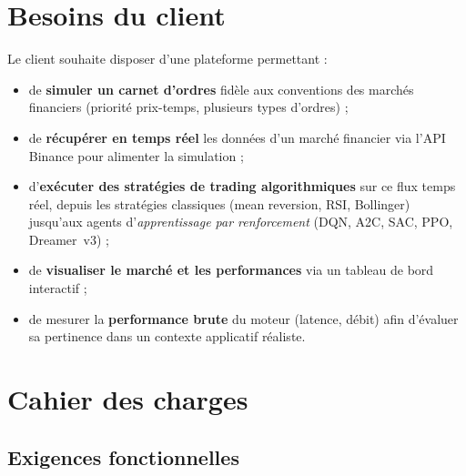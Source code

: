 \documentclass[11pt,a4paper]{article}
\begin{document}
\section{Besoins du client}
\label{sec:besoins}

Le client souhaite disposer d'une plateforme permettant :

\begin{itemize}[leftmargin=1.2cm]
    \item de \textbf{simuler un carnet d'ordres} fidèle aux
          conventions des marchés financiers (priorité prix-temps,
          plusieurs types d'ordres) ;
    \item de \textbf{récupérer en temps réel} les données d'un
          marché financier via l'API Binance pour alimenter la simulation ;
    \item d'\textbf{exécuter des stratégies de trading
          algorithmiques} sur ce flux temps réel, depuis les
          stratégies classiques (mean reversion, RSI, Bollinger)
          jusqu'aux agents d'\textit{apprentissage par
          renforcement} (DQN, A2C, SAC, PPO, Dreamer~v3) ;
    \item de \textbf{visualiser le marché et les performances}
          via un tableau de bord interactif ;
    \item de mesurer la \textbf{performance brute} du moteur
          (latence, débit) afin d'évaluer sa pertinence dans un
          contexte applicatif réaliste.
\end{itemize}

\section{Cahier des charges}
\label{sec:cdc}

\subsection{Exigences fonctionnelles}
\end{document}
